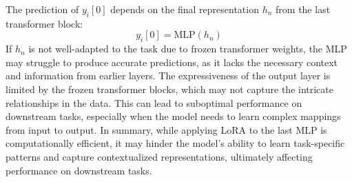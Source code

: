 \begin{enumerate}
\begin{enumerate}
\begin{answerbox}[5in]
\begin{itemize}
    The prediction of $y_i[0]$ depends on the final representation $h_n$ from the last transformer block:
    \[
    y_i[0] = \text{MLP}(h_n)
    \]
    If $h_n$ is not well-adapted to the task due to frozen transformer weights, the MLP may struggle to produce accurate predictions, as it lacks the necessary context and information from earlier layers.
    The expressiveness of the output layer is limited by the frozen transformer blocks, which may not capture the intricate relationships in the data. This can lead to suboptimal performance on downstream tasks, especially when the model needs to learn complex mappings from input to output.
    In summary, while applying LoRA to the last MLP is computationally efficient, it may hinder the model's ability to learn task-specific patterns and capture contextualized representations, ultimately affecting performance on downstream tasks.
\end{itemize}
\end{answerbox}
~
\end{enumerate}



\end{enumerate}

